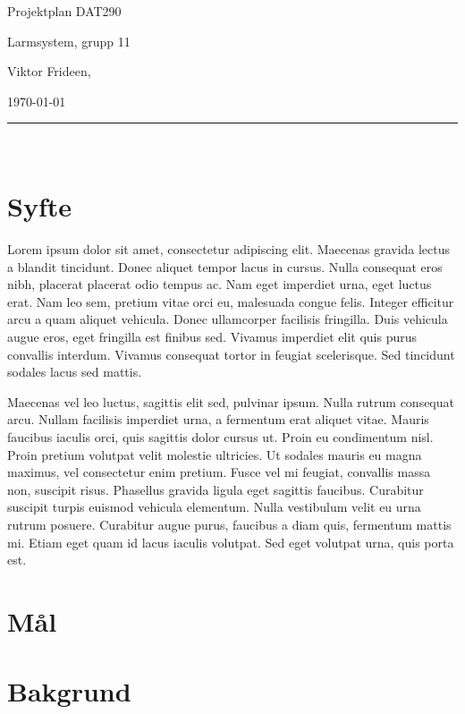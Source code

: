 \documentclass{article}
\begin{document}
\begin{center}
\thispagestyle{empty}
\parskip=14pt%
\vspace*{3\parskip}%

{\LARGE Projektplan DAT290}

{\large Larmsystem, grupp 11

Viktor Frideen, 

\today}


\rule{7cm}{0.4pt}\\
\end{center}
\newpage

\thispagestyle{empty}
\tableofcontents
\newpage


\section{Syfte}
Lorem ipsum dolor sit amet, consectetur adipiscing elit. Maecenas gravida lectus a blandit tincidunt. Donec aliquet tempor lacus in cursus. Nulla consequat eros nibh, placerat placerat odio tempus ac. Nam eget imperdiet urna, eget luctus erat. Nam leo sem, pretium vitae orci eu, malesuada congue felis. Integer efficitur arcu a quam aliquet vehicula. Donec ullamcorper facilisis fringilla. Duis vehicula augue eros, eget fringilla est finibus sed. Vivamus imperdiet elit quis purus convallis interdum. Vivamus consequat tortor in feugiat scelerisque. Sed tincidunt sodales lacus sed mattis.\par
Maecenas vel leo luctus, sagittis elit sed, pulvinar ipsum. Nulla rutrum consequat arcu. Nullam facilisis imperdiet urna, a fermentum erat aliquet vitae. Mauris faucibus iaculis orci, quis sagittis dolor cursus ut. Proin eu condimentum nisl. Proin pretium volutpat velit molestie ultricies. Ut sodales mauris eu magna maximus, vel consectetur enim pretium. Fusce vel mi feugiat, convallis massa non, suscipit risus. Phasellus gravida ligula eget sagittis faucibus. Curabitur suscipit turpis euismod vehicula elementum. Nulla vestibulum velit eu urna rutrum posuere. Curabitur augue purus, faucibus a diam quis, fermentum mattis mi. Etiam eget quam id lacus iaculis volutpat. Sed eget volutpat urna, quis porta est.

\section{Mål}

\section{Bakgrund}
\end{document}
